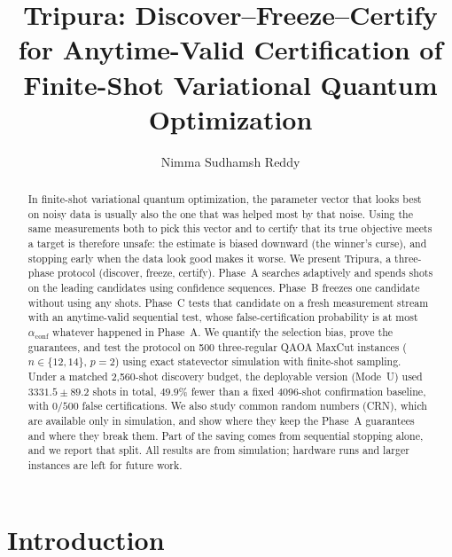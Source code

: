 \documentclass[a4paper,onecolumn,unpublished]{quantumarticle}
\newcommand{\aconf}{\alpha_{\mathrm{conf}}}
\begin{document}
\title{Tripura: Discover--Freeze--Certify for Anytime-Valid Certification of Finite-Shot Variational Quantum Optimization}

\author{Nimma Sudhamsh Reddy}

\maketitle

\begin{abstract}
\noindent In finite-shot variational quantum optimization, the parameter vector that looks best on noisy data is usually also the one that was helped most by that noise. Using the same measurements both to pick this vector and to certify that its true objective meets a target is therefore unsafe: the estimate is biased downward (the winner's curse), and stopping early when the data look good makes it worse. We present Tripura, a three-phase protocol (discover, freeze, certify). Phase~A searches adaptively and spends shots on the leading candidates using confidence sequences. Phase~B freezes one candidate without using any shots. Phase~C tests that candidate on a fresh measurement stream with an anytime-valid sequential test, whose false-certification probability is at most $\aconf$ whatever happened in Phase~A. We quantify the selection bias, prove the guarantees, and test the protocol on 500 three-regular QAOA MaxCut instances ($n \in \{12, 14\}$, $p = 2$) using exact statevector simulation with finite-shot sampling. Under a matched 2,560-shot discovery budget, the deployable version (Mode~U) used $3331.5 \pm 89.2$ shots in total, $49.9\%$ fewer than a fixed 4096-shot confirmation baseline, with $0/500$ false certifications. We also study common random numbers (CRN), which are available only in simulation, and show where they keep the Phase~A guarantees and where they break them. Part of the saving comes from sequential stopping alone, and we report that split. All results are from simulation; hardware runs and larger instances are left for future work.
\end{abstract}

\section{Introduction}
\label{sec:intro}
\end{document}
